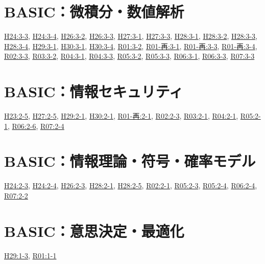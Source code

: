 \section{BASIC：微積分・数値解析}
\hyperref[q:h24-reg-basic-3-3]{H24:3-3}, \hyperref[q:h24-reg-basic-3-4]{H24:3-4}, \hyperref[q:h26-reg-basic-3-2]{H26:3-2}, \hyperref[q:h26-reg-basic-3-3]{H26:3-3}, \hyperref[q:h27-reg-basic-3-1]{H27:3-1}, \hyperref[q:h27-reg-basic-3-3]{H27:3-3}, \hyperref[q:h28-reg-basic-3-1]{H28:3-1}, \hyperref[q:h28-reg-basic-3-2]{H28:3-2}, \hyperref[q:h28-reg-basic-3-3]{H28:3-3}, \hyperref[q:h28-reg-basic-3-4]{H28:3-4}, \hyperref[q:h29-reg-basic-3-1]{H29:3-1}, \hyperref[q:h30-reg-basic-3-1]{H30:3-1}, \hyperref[q:h30-reg-basic-3-4]{H30:3-4}, \hyperref[q:r01-reg-basic-3-2]{R01:3-2}, \hyperref[q:r01-ret-basic-3-1]{R01-再:3-1}, \hyperref[q:r01-ret-basic-3-3]{R01-再:3-3}, \hyperref[q:r01-ret-basic-3-4]{R01-再:3-4}, \hyperref[q:r02-reg-basic-3-3]{R02:3-3}, \hyperref[q:r03-reg-basic-3-2]{R03:3-2}, \hyperref[q:r04-reg-basic-3-1]{R04:3-1}, \hyperref[q:r04-reg-basic-3-3]{R04:3-3}, \hyperref[q:r05-reg-basic-3-2]{R05:3-2}, \hyperref[q:r05-reg-basic-3-3]{R05:3-3}, \hyperref[q:r06-reg-basic-3-1]{R06:3-1}, \hyperref[q:r06-reg-basic-3-3]{R06:3-3}, \hyperref[q:r07-reg-basic-3-3]{R07:3-3}
\section{BASIC：情報セキュリティ}
\hyperref[q:h23-reg-basic-2-5]{H23:2-5}, \hyperref[q:h27-reg-basic-2-5]{H27:2-5}, \hyperref[q:h29-reg-basic-2-1]{H29:2-1}, \hyperref[q:h30-reg-basic-2-1]{H30:2-1}, \hyperref[q:r01-ret-basic-2-1]{R01-再:2-1}, \hyperref[q:r02-reg-basic-2-3]{R02:2-3}, \hyperref[q:r03-reg-basic-2-1]{R03:2-1}, \hyperref[q:r04-reg-basic-2-1]{R04:2-1}, \hyperref[q:r05-reg-basic-2-1]{R05:2-1}, \hyperref[q:r06-reg-basic-2-6]{R06:2-6}, \hyperref[q:r07-reg-basic-2-4]{R07:2-4}
\section{BASIC：情報理論・符号・確率モデル}
\hyperref[q:h24-reg-basic-2-3]{H24:2-3}, \hyperref[q:h24-reg-basic-2-4]{H24:2-4}, \hyperref[q:h26-reg-basic-2-3]{H26:2-3}, \hyperref[q:h28-reg-basic-2-1]{H28:2-1}, \hyperref[q:h28-reg-basic-2-5]{H28:2-5}, \hyperref[q:r02-reg-basic-2-1]{R02:2-1}, \hyperref[q:r05-reg-basic-2-3]{R05:2-3}, \hyperref[q:r05-reg-basic-2-4]{R05:2-4}, \hyperref[q:r06-reg-basic-2-4]{R06:2-4}, \hyperref[q:r07-reg-basic-2-2]{R07:2-2}
\section{BASIC：意思決定・最適化}
\hyperref[q:h29-reg-basic-1-3]{H29:1-3}, \hyperref[q:r01-reg-basic-1-1]{R01:1-1}
